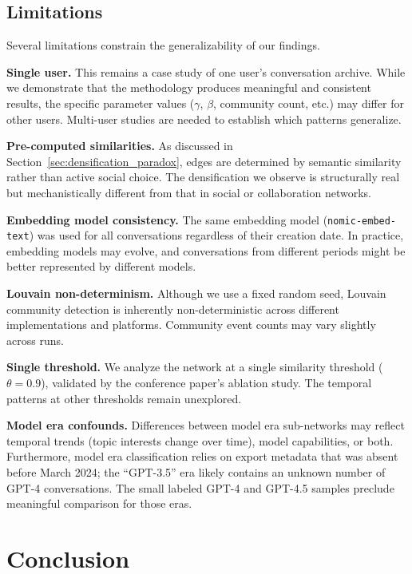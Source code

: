\documentclass[10pt,letterpaper]{article}
\begin{document}
\subsection{Limitations}
\label{sec:limitations}

Several limitations constrain the generalizability of our findings.

\textbf{Single user.} This remains a case study of one user's conversation archive. While we demonstrate that the methodology produces meaningful and consistent results, the specific parameter values ($\gamma$, $\beta$, community count, etc.) may differ for other users. Multi-user studies are needed to establish which patterns generalize.

\textbf{Pre-computed similarities.} As discussed in Section~\ref{sec:densification_paradox}, edges are determined by semantic similarity rather than active social choice. The densification we observe is structurally real but mechanistically different from that in social or collaboration networks.

\textbf{Embedding model consistency.} The same embedding model (\texttt{nomic-embed-text}) was used for all conversations regardless of their creation date. In practice, embedding models may evolve, and conversations from different periods might be better represented by different models.

\textbf{Louvain non-determinism.} Although we use a fixed random seed, Louvain community detection is inherently non-deterministic across different implementations and platforms. Community event counts may vary slightly across runs.

\textbf{Single threshold.} We analyze the network at a single similarity threshold ($\theta = 0.9$), validated by the conference paper's ablation study. The temporal patterns at other thresholds remain unexplored.

\textbf{Model era confounds.} Differences between model era sub-networks may reflect temporal trends (topic interests change over time), model capabilities, or both. Furthermore, model era classification relies on export metadata that was absent before March 2024; the ``GPT-3.5'' era likely contains an unknown number of GPT-4 conversations. The small labeled GPT-4 and GPT-4.5 samples preclude meaningful comparison for those eras.


\section{Conclusion}
\label{sec:conclusion}
\end{document}
